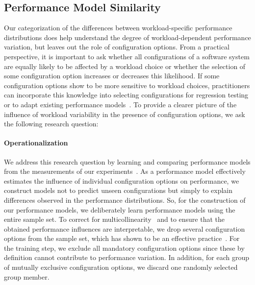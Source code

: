 

\subsection{Performance Model Similarity}\label{sec:rq2}
Our categorization of the differences between workload-specific performance distributions does help understand the degree of workload-dependent performance variation, but leaves out the role of configuration options. From a practical perspective, it is important to ask whether all configurations of a software system are equally likely to be affected by a workload choice or whether the selection of some configuration option increases or decreases this likelihood. If some configuration options show to be more sensitive to workload choices, practitioners can incorporate this knowledge into selecting configurations for regression testing or to adapt existing performance models~\cite{jamshidi_learning_2018}. To provide a clearer picture of the influence of workload variability in the presence of configuration options, we ask the following research question:


\paragraph*{Operationalization}
We address this research question by learning and comparing performance models from the measurements of our experiments~\cite{dorn2020,siegmundPerformanceinfluenceModelsHighly2015,haDeepPerf2019,perfAL,guoVariabilityawarePerformancePrediction2013,sarkarCostEfficientSamplingPerformance,guo_2018_data,fourier_learning_2015,perLasso}. As a performance model effectively estimates the influence of individual configuration options on performance, we construct models not to predict unseen configurations but simply to explain differences observed in the performance distributions. So, for the construction of our performance models, we deliberately learn performance models using the entire sample set. 
To correct for multicollinearity~\cite{Daoud_2017} and to ensure that the obtained performance influences are interpretable, we drop several configuration options from the sample set, which has shown to be an effective practice~\cite{dorn2020}. For the training step, we exclude all mandatory configuration options since these by definition cannot contribute to performance variation. In addition, for each group of mutually exclusive configuration options, we discard one randomly selected group member.

